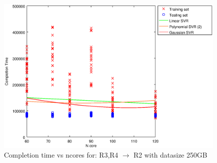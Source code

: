 
\begin {figure}[hbtp]
\centering
\includegraphics[width=\textwidth]{output/R3_R4_VS_R2_250_ALL_FEATURES/plot_R3_R4_VS_R2_250_bestmodels.eps}
\caption{Completion time vs ncores for: R3,R4 $\rightarrow$ R2 with datasize 250GB}
\label{fig:coreonly_linear_R3,R4_R2_250}
\end {figure}
